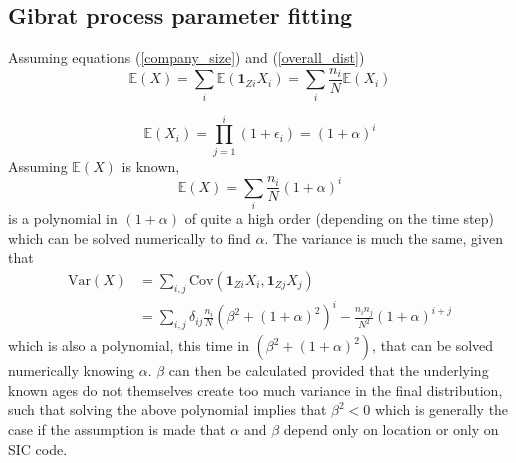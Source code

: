 \documentclass[a4paper,10pt]{article}
\begin{document}
\subsection{Gibrat process parameter fitting}
Assuming equations (\ref{company_size}) and (\ref{overall_dist})
\begin{equation}
 \mathbb{E}(X) = \sum_i\mathbb{E} (\mathbf{1}_{Zi}X_i) = \sum_i\frac{n_i}{N}\mathbb{E}(X_i)  
\end{equation}

\begin{equation}
 \mathbb{E}(X_i) = \prod_{j = 1}^i(1 + \epsilon_i) = (1 + \alpha)^i
\end{equation}
Assuming $\mathbb{E}(X)$ is known,
\begin{equation}
 \mathbb{E}(X) =\sum_i\frac{n_i}{N}(1 + \alpha)^i
\end{equation}
is a polynomial in $(1 + \alpha)$ of quite a high order (depending on the time step) which can be solved numerically to find $\alpha$.
The variance is much the same, given that 
\begin{align}
 \mathrm{Var}(X) &= \sum_{i,j}\mathrm{Cov}(\mathbf{1}_{Zi}X_i,\mathbf{1}_{Zj}X_j) \\&= \sum_{i,j} \delta_{ij}\frac{n_i}{N}(\beta^2 + (1+\alpha)^2)^i - \frac{n_in_j}{N^2}(1 + \alpha)^{i + j}
\end{align}
which is also a polynomial, this time in $(\beta^2 + (1+\alpha)^2)$, that can be solved numerically knowing $\alpha$. $\beta$ can then be calculated provided that the underlying known ages do not themselves create too much variance in the final distribution, such that solving the above polynomial implies that $\beta^2 < 0$ which is generally the case if the assumption is made that $\alpha$ and $\beta$ depend only on location or only on SIC code.
\end{document}
